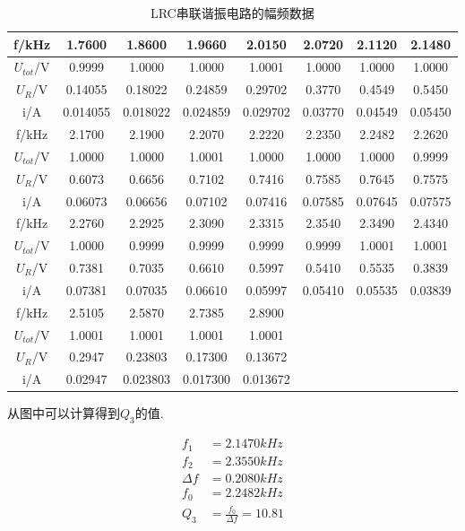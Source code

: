 \documentclass[a4paper,12pt,notitlepage]{article}
\begin{document}
\begin{center}

	\begin{longtable}{|c|c|c|c|c|c|c|c|}
	\caption{LRC串联谐振电路的幅频数据} \\
	\hline
	f/kHz & 1.7600 & 1.8600 & 1.9660 & 2.0150 & 2.0720 & 2.1120 & 2.1480 \\
	\hline
	$U_{tot}$/V & 0.9999 & 1.0000 & 1.0000 & 1.0001 & 1.0000 & 1.0000 & 1.0000 \\
	\hline
	$U_R$/V & 0.14055 & 0.18022 & 0.24859 & 0.29702 & 0.3770 & 0.4549 & 0.5450 \\
	\hline
	i/A & 0.014055 & 0.018022 & 0.024859 & 0.029702 & 0.03770 & 0.04549 & 0.05450 \\
	\hline
	\hline
	f/kHz & 2.1700 & 2.1900 & 2.2070 & 2.2220 & 2.2350 & 2.2482 & 2.2620 \\
	\hline
	$U_{tot}$/V & 1.0000 & 1.0000 & 1.0001 & 1.0000 & 1.0000 & 1.0000 & 0.9999 \\
	\hline
	$U_R$/V & 0.6073 & 0.6656 & 0.7102 & 0.7416 & 0.7585 & 0.7645 & 0.7575 \\
	\hline
	i/A & 0.06073 & 0.06656 & 0.07102 & 0.07416 & 0.07585 & 0.07645 & 0.07575 \\
	\hline
	\hline
	f/kHz & 2.2760 & 2.2925 & 2.3090 & 2.3315 & 2.3540 & 2.3490 & 2.4340 \\
	\hline
	$U_{tot}$/V & 1.0000 & 0.9999 & 0.9999 & 0.9999 & 0.9999 & 1.0001 & 1.0001 \\
	\hline
	$U_R$/V & 0.7381 & 0.7035 & 0.6610 & 0.5997 & 0.5410 & 0.5535 & 0.3839 \\
	\hline
	i/A & 0.07381 & 0.07035 & 0.06610 & 0.05997 & 0.05410 & 0.05535 & 0.03839 \\
	\hline
	\hline
	f/kHz & 2.5105 & 2.5870 & 2.7385 & 2.8900 &   & &   \\
	\hline
	$U_{tot}$/V & 1.0001 & 1.0001 & 1.0001 & 1.0001  &  &   & \\
	\hline
	$U_R$/V & 0.2947 & 0.23803 & 0.17300 & 0.13672 &  &   &  \\
	\hline
	i/A & 0.02947 & 0.023803 & 0.017300 & 0.013672 &  &    & \\
	\hline
	\end{longtable}

\end{center}

	从图中可以计算得到$Q_3$的值.

\begin{align*}
	f_1 &= 2.1470kHz \\
	f_2 &= 2.3550kHz \\
	\Delta f &= 0.2080 kHz \\
	f_0 &= 2.2482kHz \\
	Q_3 &= \frac{f_0}{\Delta f} = 10.81
\end{align*}
\end{document}
